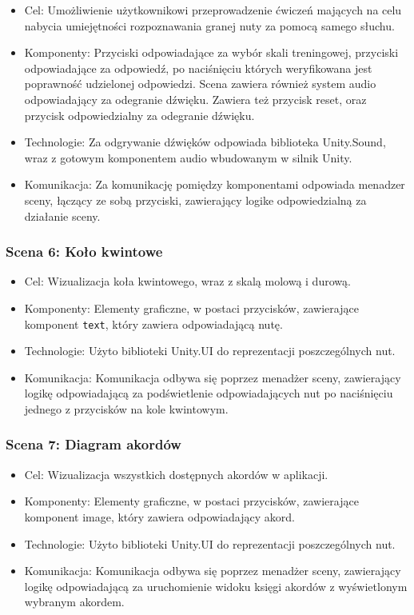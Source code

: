\begin{itemize}
\item Cel: Umożliwienie użytkownikowi przeprowadzenie ćwiczeń mających na celu nabycia umiejętności rozpoznawania granej nuty za pomocą samego słuchu.
\item Komponenty: Przyciski odpowiadające za wybór skali treningowej, przyciski odpowiadające za odpowiedź, po naciśnięciu których weryfikowana jest poprawność udzielonej odpowiedzi. Scena zawiera również system audio odpowiadający za odegranie dźwięku. Zawiera też przycisk reset, oraz przycisk odpowiedzialny za odegranie dźwięku.
\item Technologie: Za odgrywanie dźwięków odpowiada biblioteka Unity.Sound, wraz z gotowym komponentem audio wbudowanym w silnik Unity.
\item Komunikacja: Za komunikację pomiędzy komponentami odpowiada menadzer sceny, łączący ze sobą przyciski, zawierający logike odpowiedzialną za działanie sceny.
\end{itemize}

\subsubsection{Scena 6: Koło kwintowe}

\begin{itemize}
	\item Cel: Wizualizacja koła kwintowego, wraz z skalą molową i durową.
	\item Komponenty: Elementy graficzne, w postaci przycisków, zawierające komponent \texttt{text}, który zawiera odpowiadającą nutę.
	\item Technologie: Użyto biblioteki Unity.UI do reprezentacji poszczególnych nut.
	\item Komunikacja: Komunikacja odbywa się poprzez menadżer sceny, zawierający logikę odpowiadającą za podświetlenie odpowiadających nut po naciśnięciu jednego z przycisków na kole kwintowym.
\end{itemize}

\subsubsection{Scena 7: Diagram akordów}

\begin{itemize}
	\item Cel: Wizualizacja wszystkich dostępnych akordów w aplikacji.
	\item Komponenty: Elementy graficzne, w postaci przycisków, zawierające komponent image, który zawiera odpowiadający akord.
	\item Technologie: Użyto biblioteki Unity.UI do reprezentacji poszczególnych nut.
	\item Komunikacja: Komunikacja odbywa się poprzez menadżer sceny, zawierający logikę odpowiadającą za uruchomienie widoku księgi akordów z wyświetlonym wybranym akordem.
\end{itemize}

